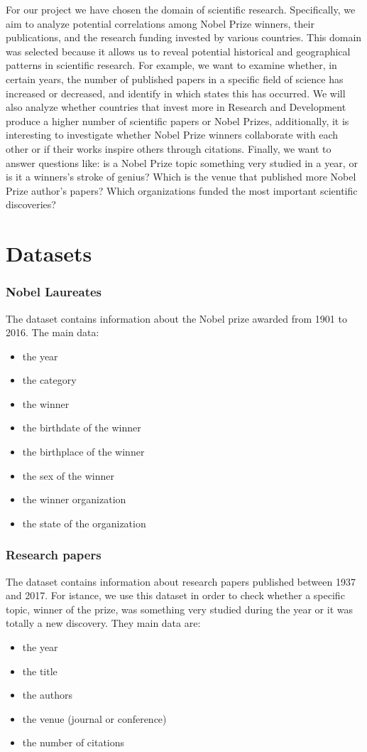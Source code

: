 \documentclass{article}
\begin{document}
For our project we have chosen the domain of scientific research. Specifically, we aim to analyze potential correlations among Nobel Prize winners,
their publications, and the research funding invested by various countries. This domain was selected because it allows us to reveal potential historical
and geographical patterns in scientific research. 
For example, we want to examine whether, in certain years, the number of published papers in a specific field of science has increased or decreased, and
identify in which states this has occurred. We will also analyze whether countries that invest more in Research and Development produce a higher number
of scientific papers or Nobel Prizes, additionally, it is interesting to investigate whether Nobel Prize winners
collaborate with each other or if their works inspire others through citations. Finally, we want to answer questions like: is a Nobel Prize topic something
very studied in a year, or is it a winners's stroke of genius? Which is the venue that published more Nobel Prize author's papers? Which organizations
funded the most important scientific discoveries?
\section*{Datasets}
\subsubsection*{Nobel Laureates}
The dataset contains information about the Nobel prize awarded from 1901 to 2016. The main data:
\begin{multicols}{2}
  \begin{itemize}
    \item the year
    \item the category
    \item the winner
    \item the birthdate of the winner
    \item the birthplace of the winner
    \item the sex of the winner
    \item the winner organization
    \item the state of the organization
  \end{itemize}
  \end{multicols}
\subsubsection*{Research papers}
The dataset contains information about research papers published between 1937 and 2017. For istance, we use this dataset in order to check whether a
specific topic, winner of the prize, was something very studied during the year or it was totally a new discovery. They main data are:
\begin{itemize}
	\item the year
	\item the title
	\item the authors
	\item the venue (journal or conference)
	\item the number of citations
\end{itemize}
\end{document}
